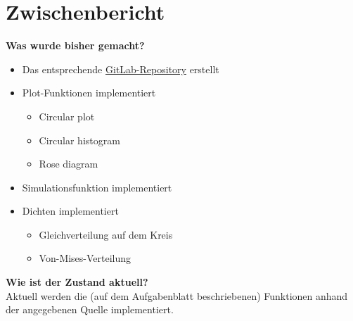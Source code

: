 \documentclass{scrartcl}
\begin{document}
\section*{Zwischenbericht}
\noindent\textbf{Was wurde bisher gemacht?}
\begin{itemize}
	\item Das entsprechende \href{https://gitlab.com/Jan-Agatz/circulardata}{GitLab-Repository} erstellt
	\item Plot-Funktionen implementiert
	\begin{itemize}
			\item Circular plot
			\item Circular histogram
			\item Rose diagram
		  \end{itemize}
	\item Simulationsfunktion implementiert
	\item Dichten implementiert
	\begin{itemize}
		\item Gleichverteilung auf dem Kreis
		\item Von-Mises-Verteilung
	\end{itemize}
\end{itemize}


\noindent\textbf{Wie ist der Zustand aktuell?} \\
\noindent Aktuell werden die (auf dem Aufgabenblatt beschriebenen) Funktionen anhand der angegebenen Quelle implementiert. \\

\end{document}
